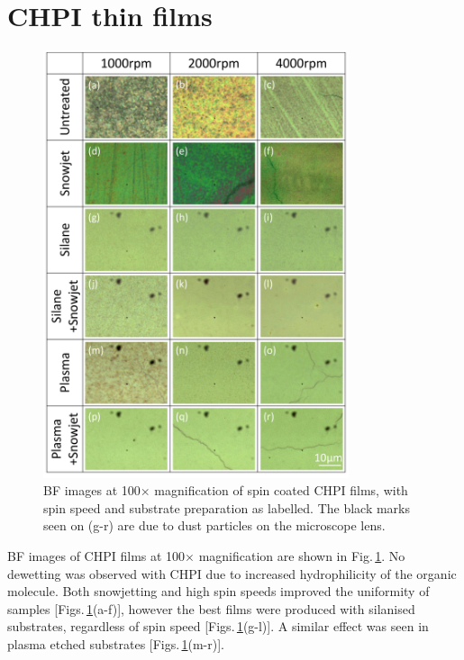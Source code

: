 \section{CHPI thin films}
\begin{figure}[h!] 
\centering    
\includegraphics[width=0.8\textwidth]{Fig5}
\caption{BF images at 100$\times$ magnification of spin coated CHPI films, with spin speed and substrate preparation as labelled. The black marks seen on (g-r) are due to dust particles on the microscope lens.}
\label{4Fig5}
\end{figure}
BF images of CHPI films at 100$\times$ magnification are shown in Fig.\,\ref{4Fig5}. No dewetting was observed with CHPI due to increased hydrophilicity of the organic molecule. Both snowjetting and high spin speeds improved the uniformity of samples [Figs.\,\ref{4Fig5}(a-f)], however the best films were produced with silanised substrates, regardless of spin speed [Figs.\,\ref{4Fig5}(g-l)]. A similar effect was seen in plasma etched substrates [Figs.\,\ref{4Fig5}(m-r)].


